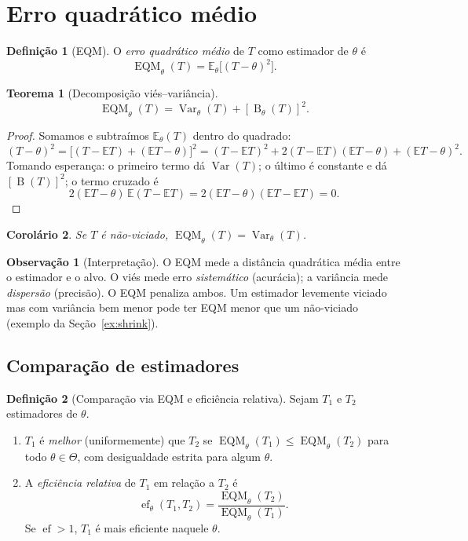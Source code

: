 \documentclass[11pt,a4paper]{article}
\theoremstyle{definition}
\newtheorem{definicao}{Definição}[section]
\newtheorem{observacao}{Observação}[section]
\theoremstyle{plain}
\newtheorem{teorema}{Teorema}[section]
\newtheorem{corolario}[teorema]{Corolário}
\newcommand{\E}{\mathbb{E}}
\newcommand{\Var}{\operatorname{Var}}
\newcommand{\EQM}{\operatorname{EQM}}
\newcommand{\B}{\operatorname{B}}
\begin{document}
\section{Erro quadrático médio}

\begin{definicao}[EQM]
O \emph{erro quadrático médio} de $T$ como estimador de $\theta$ é
\[
\EQM_\theta(T)=\E_\theta\big[(T-\theta)^2\big].
\]
\end{definicao}

\begin{teorema}[Decomposição viés--variância]\label{teo:decomp}
\[
\EQM_\theta(T)=\Var_\theta(T)+[\B_\theta(T)]^2 .
\]
\end{teorema}
\begin{proof}
Somamos e subtraímos $\E_\theta(T)$ dentro do quadrado:
\[
(T-\theta)^2=\big[(T-\E T)+(\E T-\theta)\big]^2
=(T-\E T)^2+2(T-\E T)(\E T-\theta)+(\E T-\theta)^2 .
\]
Tomando esperança: o primeiro termo dá $\Var(T)$; o último é constante e dá $[\B(T)]^2$; o termo cruzado é
\[
2(\E T-\theta)\,\E(T-\E T)=2(\E T-\theta)(\E T-\E T)=0 .
\]
\end{proof}

\begin{corolario}
Se $T$ é não-viciado, $\EQM_\theta(T)=\Var_\theta(T)$.
\end{corolario}

\begin{observacao}[Interpretação]
O EQM mede a distância quadrática média entre o estimador e o alvo. O viés mede erro \emph{sistemático} (acurácia); a variância mede \emph{dispersão} (precisão). O EQM penaliza ambos. Um estimador levemente viciado mas com variância bem menor pode ter EQM menor que um não-viciado (exemplo da Seção~\ref{ex:shrink}).
\end{observacao}

\subsection{Comparação de estimadores}

\begin{definicao}[Comparação via EQM e eficiência relativa]
Sejam $T_1$ e $T_2$ estimadores de $\theta$.
\begin{enumerate}[label=(\roman*)]
\item $T_1$ é \emph{melhor} (uniformemente) que $T_2$ se $\EQM_\theta(T_1)\le\EQM_\theta(T_2)$ para todo $\theta\in\Theta$, com desigualdade estrita para algum $\theta$.
\item A \emph{eficiência relativa} de $T_1$ em relação a $T_2$ é
\[
\operatorname{ef}_\theta(T_1,T_2)=\frac{\EQM_\theta(T_2)}{\EQM_\theta(T_1)} .
\]
Se $\operatorname{ef}>1$, $T_1$ é mais eficiente naquele $\theta$.
\end{enumerate}
\end{definicao}
\end{document}
